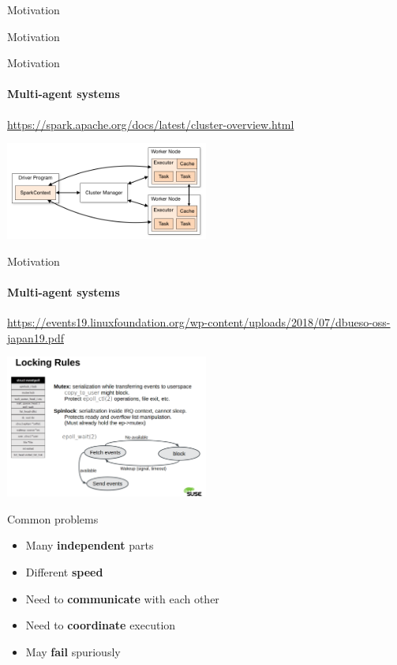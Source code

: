 \begin{section}{Motivation}
\begin{frame}{Motivation}
\end{frame}


\begin{frame}{Motivation}
\framesubtitle{Multi-agent systems}

{\tiny\url{https://spark.apache.org/docs/latest/cluster-overview.html}}

\begin{center}
\includegraphics[width=0.5\textwidth]{./pics/spark.png}
\end{center}

\end{frame}


\begin{frame}{Motivation}
\framesubtitle{Multi-agent systems}

{\tiny\url{https://events19.linuxfoundation.org/wp-content/uploads/2018/07/dbueso-oss-japan19.pdf}}

\begin{center}
\includegraphics[width=0.5\textwidth]{./pics/epoll_something.png}
\end{center}
\end{frame}


\begin{frame}{Common problems}

\begin{itemize}
    \item Many \textbf{independent} parts
    \item Different \textbf{speed}
    \item Need to \textbf{communicate} with each other
    \item Need to \textbf{coordinate} execution
    \item May \textbf{fail} spuriously
\end{itemize}



\end{frame}
\end{section}
